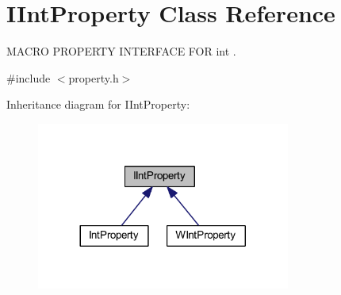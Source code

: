 \hypertarget{class_i_int_property}{\section{I\-Int\-Property Class Reference}
\label{class_i_int_property}
}


M\-A\-C\-R\-O P\-R\-O\-P\-E\-R\-T\-Y I\-N\-T\-E\-R\-F\-A\-C\-E F\-O\-R int .  




{\ttfamily \#include $<$property.\-h$>$}



Inheritance diagram for I\-Int\-Property\-:
\nopagebreak
\begin{figure}[H]
\begin{center}
\leavevmode
\includegraphics[width=236pt]{class_i_int_property__inherit__graph}
\end{center}
\end{figure}
